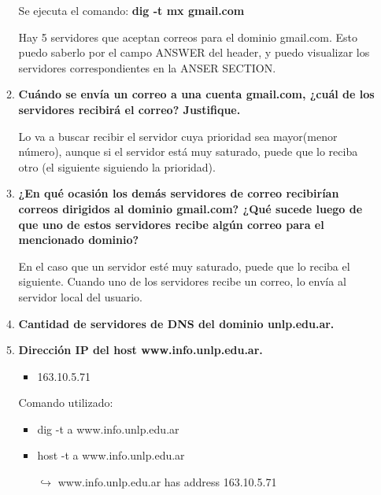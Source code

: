 \documentclass[a4paper,10pt]{article}
\begin{document}
\begin{enumerate}
\begin{enumerate}
                Se ejecuta el comando:
                \subitem \textbf{dig -t mx gmail.com}
                
                Hay 5 servidores que aceptan correos para el dominio gmail.com. Esto puedo saberlo por el campo ANSWER del header, y puedo visualizar los servidores correspondientes en la ANSER SECTION.
                
                \item \textbf{Cuándo se envía un correo a una cuenta gmail.com, ¿cuál de los servidores recibirá el correo? Justifique.}
                
                Lo va a buscar recibir el servidor cuya prioridad sea mayor(menor número), aunque si el servidor está muy saturado, puede que lo reciba otro (el siguiente siguiendo la prioridad).
                
                \item \textbf{ ¿En qué ocasión los demás servidores de correo recibirían correos dirigidos al dominio gmail.com? ¿Qué sucede luego de que uno de estos servidores recibe algún correo para el mencionado dominio?}
                
                En el caso que un servidor esté muy saturado, puede que lo reciba el siguiente. Cuando uno de los servidores recibe un correo, lo envía al servidor local del usuario.
                
                \item \textbf{Cantidad de servidores de DNS del dominio unlp.edu.ar.}
                
                
                \item \textbf{Dirección IP del host www.info.unlp.edu.ar.}
                    \begin{itemize}
                        \item 163.10.5.71
                    \end{itemize} 
                Comando utilizado:
                    \begin{itemize}
                        \item dig -t a www.info.unlp.edu.ar
                        \item host -t a www.info.unlp.edu.ar
                        
                        $\hookrightarrow{}$ www.info.unlp.edu.ar has address 163.10.5.71 
                    \end{itemize}                
            \end{enumerate}
            

\end{enumerate}
\end{document}
